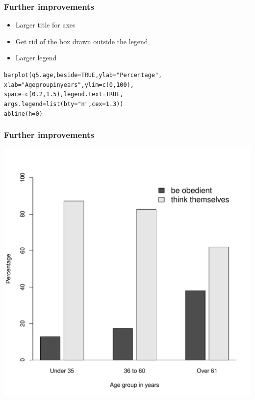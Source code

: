 \documentclass{beamer}\usepackage[]{graphicx}\usepackage[]{color}
\makeatletter
\newcommand{\hlnum}[1]{\textcolor[rgb]{0.533,0,0.133}{#1}}%
\newcommand{\hlstr}[1]{\textcolor[rgb]{0.667,0.267,0}{#1}}%
\newcommand{\hlstd}[1]{\textcolor[rgb]{0,0,0}{#1}}%
\newcommand{\hlkwc}[1]{\textcolor[rgb]{0,0,0.4}{#1}}%
\newcommand{\hlkwd}[1]{\textcolor[rgb]{0,0.267,0.4}{#1}}%
\newenvironment{kframe}{%
 \def\at@end@of@kframe{}%
 \ifinner\ifhmode%
  \def\at@end@of@kframe{\end{minipage}}%
  \begin{minipage}{\columnwidth}%
 \fi\fi%
 \def\FrameCommand##1{\hskip\@totalleftmargin \hskip-\fboxsep
 \colorbox{shadecolor}{##1}\hskip-\fboxsep
     \hskip-\linewidth \hskip-\@totalleftmargin \hskip\columnwidth}%
 \MakeFramed {\advance\hsize-\width
   \@totalleftmargin\z@ \linewidth\hsize
   \@setminipage}}%
 {\par\unskip\endMakeFramed%
 \at@end@of@kframe}
\newenvironment{knitrout}{}{} %
\makeatother
\begin{document}
\begin{frame}[fragile]
  \frametitle{Further improvements}
\begin{itemize}
\item Larger title for axes
\item Get rid of the box drawn outside the legend
\item Larger legend
\end{itemize}
\begin{knitrout}
\color{fgcolor}\begin{kframe}
\begin{alltt}
\hlkwd{barplot}\hlstd{(q5.age,} \hlkwc{beside} \hlstd{=} \hlnum{TRUE}\hlstd{,} \hlkwc{ylab} \hlstd{=} \hlstr{"Percentage"}\hlstd{,}
        \hlkwc{xlab} \hlstd{=} \hlstr{"Age group in years"}\hlstd{,} \hlkwc{ylim} \hlstd{=} \hlkwd{c}\hlstd{(}\hlnum{0}\hlstd{,} \hlnum{100}\hlstd{),}
        \hlkwc{space} \hlstd{=} \hlkwd{c}\hlstd{(}\hlnum{0.2}\hlstd{,} \hlnum{1.5}\hlstd{),} \hlkwc{legend.text} \hlstd{=} \hlnum{TRUE}\hlstd{,}
        \hlkwc{args.legend} \hlstd{=} \hlkwd{list}\hlstd{(}\hlkwc{bty} \hlstd{=} \hlstr{"n"}\hlstd{,} \hlkwc{cex} \hlstd{=} \hlnum{1.3}\hlstd{))}
\hlkwd{abline}\hlstd{(}\hlkwc{h} \hlstd{=} \hlnum{0}\hlstd{)}
\end{alltt}
\end{kframe}
\end{knitrout}
\end{frame}


\begin{frame}[fragile]
  \frametitle{Further improvements}
\begin{knitrout}
\color{fgcolor}

{\centering \includegraphics[width=0.6\linewidth]{figure/bar9-1} 

}



\end{knitrout}
\end{frame}
\end{document}
